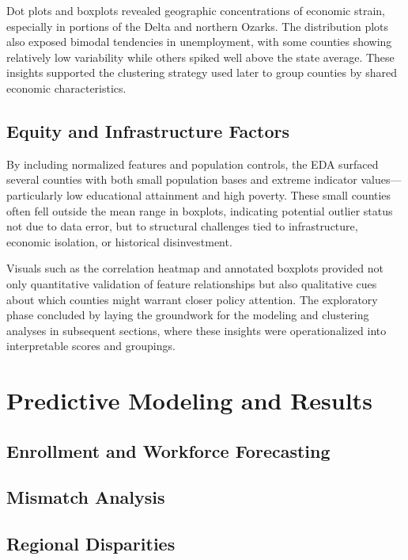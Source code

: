 \documentclass[12pt]{llncs}
\begin{document}
Dot plots and boxplots revealed geographic concentrations of economic strain, especially in portions of the Delta and northern Ozarks. The distribution plots also exposed bimodal tendencies in unemployment, with some counties showing relatively low variability while others spiked well above the state average. These insights supported the clustering strategy used later to group counties by shared economic characteristics.

\subsection{Equity and Infrastructure Factors}

By including normalized features and population controls, the EDA surfaced several counties with both small population bases and extreme indicator values—particularly low educational attainment and high poverty. These small counties often fell outside the mean range in boxplots, indicating potential outlier status not due to data error, but to structural challenges tied to infrastructure, economic isolation, or historical disinvestment.

Visuals such as the correlation heatmap and annotated boxplots provided not only quantitative validation of feature relationships but also qualitative cues about which counties might warrant closer policy attention. The exploratory phase concluded by laying the groundwork for the modeling and clustering analyses in subsequent sections, where these insights were operationalized into interpretable scores and groupings.




\section{Predictive Modeling and Results}
\subsection{Enrollment and Workforce Forecasting}

\subsection{Mismatch Analysis}

\subsection{Regional Disparities}
\end{document}
